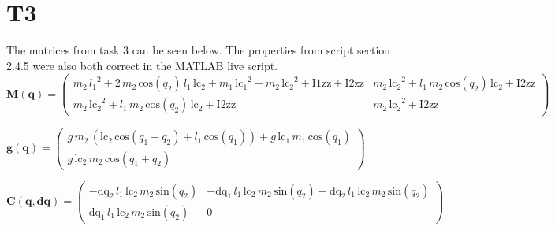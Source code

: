 \documentclass[12pt]{article}
\begin{document}
\section{T3}
The matrices from task 3 can be seen below. The properties from script section 2.4.5 were also both correct in the MATLAB live script.
\\

$\pmb{M(q)}=\left(\begin{array}{cc}
m_2 \,{l_1 }^2 +2\,m_2 \,\mathrm{cos}\left(q_2 \right)\,l_1 \,{\textrm{lc}}_2 +m_1 \,{{\textrm{lc}}_1 }^2 +m_2 \,{{\textrm{lc}}_2 }^2 +\mathrm{I1zz}+\mathrm{I2zz} & m_2 \,{{\textrm{lc}}_2 }^2 +l_1 \,m_2 \,\mathrm{cos}\left(q_2 \right)\,{\textrm{lc}}_2 +\mathrm{I2zz}\\
m_2 \,{{\textrm{lc}}_2 }^2 +l_1 \,m_2 \,\mathrm{cos}\left(q_2 \right)\,{\textrm{lc}}_2 +\mathrm{I2zz} & m_2 \,{{\textrm{lc}}_2 }^2 +\mathrm{I2zz}
\end{array}\right)$


$\pmb{g(q)}=\left(\begin{array}{c}
g\,m_2 \,{\left({\textrm{lc}}_2 \,\mathrm{cos}\left(q_1 +q_2 \right)+l_1 \,\mathrm{cos}\left(q_1 \right)\right)}+g\,{\textrm{lc}}_1 \,m_1 \,\mathrm{cos}\left(q_1 \right)\\
g\,{\textrm{lc}}_2 \,m_2 \,\mathrm{cos}\left(q_1 +q_2 \right)
\end{array}\right)$

$\pmb{C(q,dq)}=\left(\begin{array}{cc}
-{\textrm{dq}}_2 \,l_1 \,{\textrm{lc}}_2 \,m_2 \,\mathrm{sin}\left(q_2 \right) & -{\textrm{dq}}_1 \,l_1 \,{\textrm{lc}}_2 \,m_2 \,\mathrm{sin}\left(q_2 \right)-{\textrm{dq}}_2 \,l_1 \,{\textrm{lc}}_2 \,m_2 \,\mathrm{sin}\left(q_2 \right)\\
{\textrm{dq}}_1 \,l_1 \,{\textrm{lc}}_2 \,m_2 \,\mathrm{sin}\left(q_2 \right) & 0
\end{array}\right)$

\newpage
\end{document}
